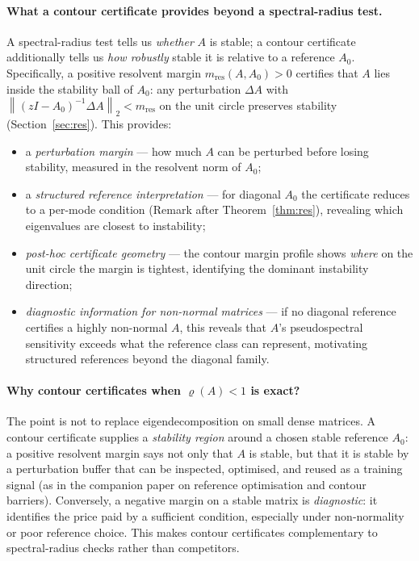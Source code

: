 \documentclass{article}
\theoremstyle{definition}
\newcommand{\norm}[1]{\left\|#1\right\|}
\begin{document}
\paragraph{What a contour certificate provides beyond a spectral-radius test.}
A spectral-radius test tells us \emph{whether} $A$ is stable; a contour
certificate additionally tells us \emph{how robustly} stable it is relative
to a reference $A_0$.  Specifically, a positive resolvent margin
$m_{\mathrm{res}}(A, A_0) > 0$ certifies that $A$ lies inside the stability
ball of $A_0$: any perturbation $\Delta A$ with $\norm{(zI -
A_0)^{-1}\Delta A}_2 < m_{\mathrm{res}}$ on the unit circle preserves stability
(Section~\ref{sec:res}).  This provides:
\begin{itemize}
  \item a \emph{perturbation margin} --- how much $A$ can be perturbed before
    losing stability, measured in the resolvent norm of $A_0$;
  \item a \emph{structured reference interpretation} --- for diagonal $A_0$
    the certificate reduces to a per-mode condition (Remark after
    Theorem~\ref{thm:res}), revealing which eigenvalues are closest to instability;
  \item \emph{post-hoc certificate geometry} --- the contour margin profile shows
    \emph{where} on the unit circle the margin is tightest, identifying the
    dominant instability direction;
  \item \emph{diagnostic information for non-normal matrices} --- if no diagonal
    reference certifies a highly non-normal $A$, this reveals that $A$'s
    pseudospectral sensitivity exceeds what the reference class can represent,
    motivating structured references beyond the diagonal family.
\end{itemize}

\paragraph{Why contour certificates when $\varrho(A) < 1$ is exact?}
The point is not to replace eigendecomposition on small dense matrices.
A contour certificate supplies a \emph{stability region} around a chosen
stable reference $A_0$: a positive resolvent margin says not only that $A$
is stable, but that it is stable by a perturbation buffer that can be
inspected, optimised, and reused as a training signal (as in the companion
paper on reference optimisation and contour barriers).  Conversely, a negative margin on a stable matrix is
\emph{diagnostic}: it identifies the price paid by a sufficient condition,
especially under non-normality or poor reference choice.  This makes
contour certificates complementary to spectral-radius checks rather than
competitors.
\end{document}
